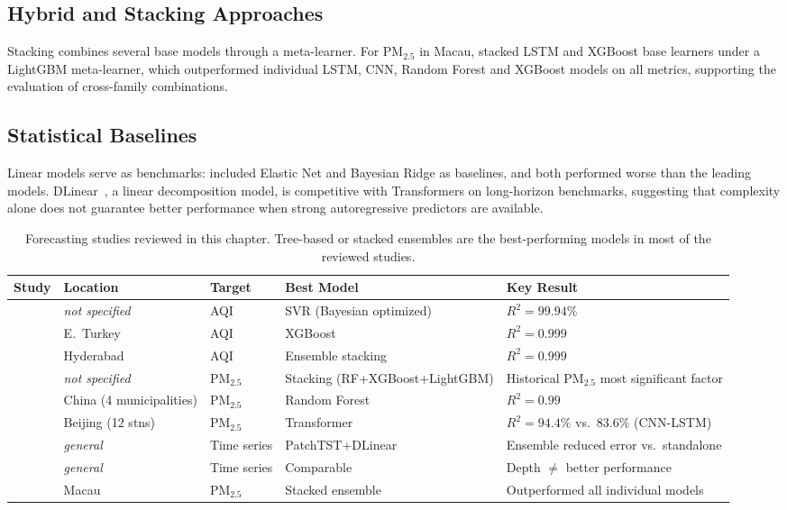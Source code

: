 \subsection{Hybrid and Stacking Approaches}
Stacking combines several base models through a meta-learner. For PM$_{2.5}$ in Macau, \textcite{tian2024} stacked LSTM and XGBoost base learners under a LightGBM meta-learner, which outperformed individual LSTM, CNN, Random Forest and XGBoost models on all metrics, supporting the evaluation of cross-family combinations.

\subsection{Statistical Baselines}
Linear models serve as benchmarks: \textcite{ozupak2025} included Elastic Net and Bayesian Ridge as baselines, and both performed worse than the leading models. DLinear~\parencite{zeng2023dlinear}, a linear decomposition model, is competitive with Transformers on long-horizon benchmarks, suggesting that complexity alone does not guarantee better performance when strong autoregressive predictors are available.

\begin{table}[htbp]
  \centering
  \caption{Forecasting studies reviewed in this chapter. Tree-based or stacked ensembles are the best-performing models in most of the reviewed studies.}
  \label{tab:literature_comparison}
  \small
  \begin{tabular}{p{2.6cm}p{2cm}p{1.6cm}p{2.2cm}p{3.4cm}}
    \toprule
    \textbf{Study} & \textbf{Location} & \textbf{Target} & \textbf{Best Model} & \textbf{Key Result} \\
    \midrule
    \cite{ozupak2025} & \textit{not specified} & AQI & SVR (Bayesian optimized) & $R^2=99.94\%$ \\
    \cite{tirinck2025} & E.\ Turkey & AQI & XGBoost & $R^2 = 0.999$ \\
    \cite{ravindiran2025} & Hyderabad & AQI & Ensemble stacking & $R^2 = 0.999$ \\
    \cite{kang2023} & \textit{not specified} & PM$_{2.5}$ & Stacking (RF+\allowbreak XGBoost+\allowbreak LightGBM) & Historical PM$_{2.5}$ most significant factor \\
    \cite{zhu2026} & China (4 municipalities) & PM$_{2.5}$ & Random Forest & $R^2=0.99$ \\
    \cite{cui2023} & Beijing (12 stns) & PM$_{2.5}$ & Transformer & $R^2 = 94.4\%$ vs.\ $83.6\%$ (CNN-LSTM) \\
    \cite{fan2025} & \textit{general} & Time series & PatchTST+\allowbreak DLinear & Ensemble reduced error vs.\ standalone \\
    \cite{yildirim2026} & \textit{general} & Time series & Comparable & Depth $\ne$ better performance \\
    \cite{tian2024} & Macau & PM$_{2.5}$ & Stacked ensemble & Outperformed all individual models \\
    \bottomrule
  \end{tabular}
\end{table}

